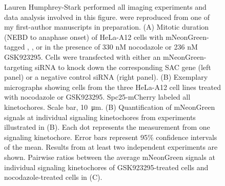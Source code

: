 \begin{figure}
    \noindent\justifying Lauren Humphrey-Stark performed all imaging experiments and data analysis involved in this figure.  were reproduced from one of my first-author manuscripts in preparation. (A) Mitotic duration (NEBD to anaphase onset) of HeLa-A12 cells with  mNeonGreen-tagged , , or  in the presence of 330 nM nocodazole or 236 nM GSK923295. Cells were transfected with either an mNeonGreen-targeting siRNA to knock down the corresponding SAC gene (left panel) or a negative control siRNA (right panel). (B) Exemplary micrographs showing cells from the three HeLa-A12 cell lines treated with nocodazole or GSK923295. Spc25-mCherry labeled all kinetochores. Scale bar, \SI{10}{\micro m}. (B) Quantification of mNeonGreen signals at individual signaling kinetochores from experiments illustrated in (B). Each dot represents the measurement from one signaling kinetochore. Error bars represent 95\% confidence intervals of the mean. Results from at least two independent experiments are shown. Pairwise ratios between the average mNeonGreen signals at individual signaling kinetochores of GSK923295-treated cells and nocodazole-treated cells in (C).
\label{SACProteinKinetochoreRecruitment}
\end{figure}


